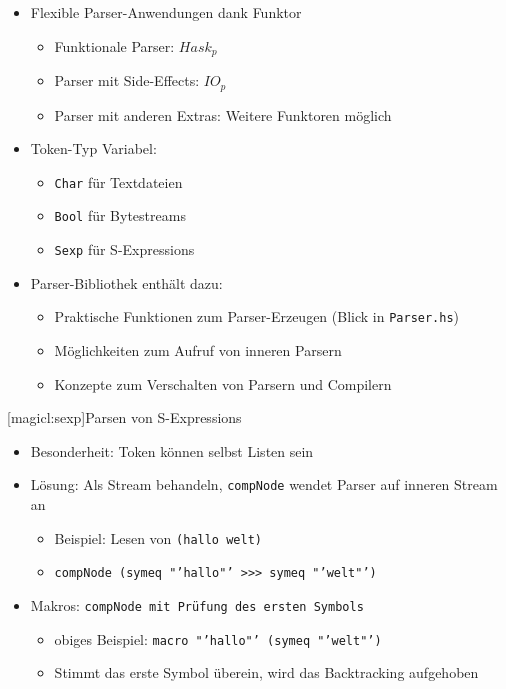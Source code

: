 \documentclass[a4paper, bibgerm]{article}
\newcommand\lsubsection{}
\begin{document}
  \begin{itemize}
  \item Flexible Parser-Anwendungen dank Funktor
    \begin{itemize}
    \item Funktionale Parser: $Hask_p$
    \item Parser mit Side-Effects: $IO_p$
    \item Parser mit anderen Extras: Weitere Funktoren möglich
    \end{itemize}
  \item Token-Typ Variabel:
    \begin{itemize}
    \item \texttt{Char} für Textdateien
    \item \texttt{Bool} für Bytestreams
    \item \texttt{Sexp} für S-Expressions
    \end{itemize}
  \item Parser-Bibliothek enthält dazu:
    \begin{itemize}
    \item Praktische Funktionen zum Parser-Erzeugen (Blick in \texttt{Parser.hs})
    \item Möglichkeiten zum Aufruf von inneren Parsern
    \item Konzepte zum Verschalten von Parsern und Compilern
    \end{itemize}
  \end{itemize}

\lsubsection[magicl:sexp]{Parsen von S-Expressions}
  \begin{itemize}
  \item Besonderheit: Token können selbst Listen sein
  \item Lösung: Als Stream behandeln, \texttt{compNode} wendet Parser
    auf inneren Stream an
    \begin{itemize}
    \item Beispiel: Lesen von \texttt{(hallo welt)}
    \item \texttt{compNode (symeq "'hallo"' >>> symeq "'welt"') } %
    \end{itemize}
  \item Makros: \texttt{compNode mit Prüfung des ersten Symbols}
    \begin{itemize}
    \item obiges Beispiel: \texttt{macro "'hallo"' (symeq "'welt"')}
    \item Stimmt das erste Symbol überein, wird das Backtracking aufgehoben
    \end{itemize}
  \end{itemize}
\end{document}
